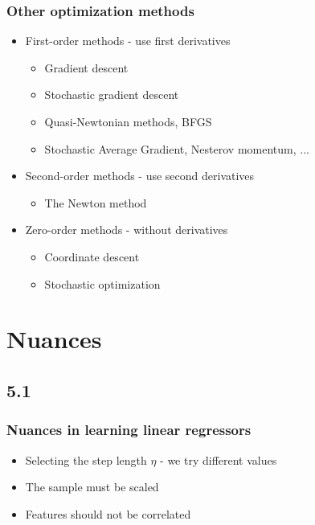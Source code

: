 \documentclass[default]{beamer}
\begin{document}
	\begin{frame}	
		\frametitle{Other optimization methods}
		
		\Large
		\begin{itemize}
			\item First-order methods - use first derivatives
			\begin{itemize}
				\item Gradient descent
				\item Stochastic gradient descent
				\item Quasi-Newtonian methods, BFGS
				\item Stochastic Average Gradient, Nesterov momentum, ...
				
			\end{itemize}
			\item Second-order methods - use second derivatives
			\begin{itemize}
				\item The Newton method
			\end{itemize}
			\item Zero-order methods - without derivatives
			\begin{itemize}
				\item Coordinate descent
				\item Stochastic optimization
			\end{itemize}
			
		\end{itemize}
		
	\end{frame}

	\section{Nuances}
	\subsection{5.1}
	\begin{frame}	
		\frametitle{Nuances in learning linear regressors}
		
		\Large
		\begin{itemize}
			\item Selecting the step length $\eta$ - we try different values
			\item The sample must be scaled
			\item Features should not be correlated
		\end{itemize}

	\end{frame}
\end{document}
